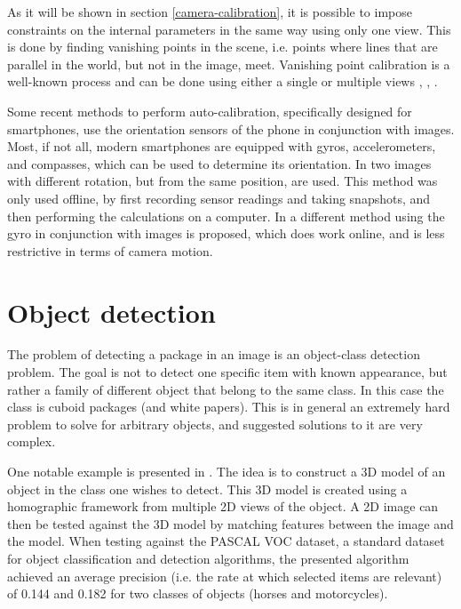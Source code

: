 As it will be shown in section \ref{camera-calibration}, it is possible to impose constraints on the internal parameters in the same way using only one view.
This is done by finding vanishing points in the scene, i.e. points where lines that are parallel in the world, but not in the image, meet.
Vanishing point calibration is a well-known process and can be done using either a single or multiple views \cite{guillou2000using}, \cite[195-226]{hartley-zisserman}, \cite{caprile1990using}.

Some recent methods to perform auto-calibration, specifically designed for smartphones, use the orientation sensors of the phone in conjunction with images.
Most, if not all, modern  smartphones are equipped with gyros, accelerometers, and compasses, which can be used to determine its orientation.
In \cite{saponaro2013towards} two images with different rotation, but from the same position, are used.
This method was only used offline, by first recording sensor readings and taking snapshots, and then performing the calculations on a computer. %
In \cite{jia2014online} a different method using the gyro in conjunction with images is proposed, which does work online, and is less restrictive in terms of camera motion.

\section{Object detection} \label{related_work:object_detection}
The problem of detecting a package in an image is an object-class detection problem.
The goal is not to detect one specific item with known appearance, but rather a family of different object that belong to the same class.
In this case the class is cuboid packages (and white papers).
This is in general an extremely hard problem to solve for arbitrary objects, and suggested solutions to it are very complex.

One notable example is presented in \cite{yan20073d}. The idea is to construct a 3D model of an object in the class one wishes to detect.
This 3D model is created using a homographic framework from  multiple 2D views of the object.
A 2D image can then be tested against the 3D model by matching features between the image and the model. 
When testing against the PASCAL VOC dataset, a standard dataset for object classification and detection algorithms, the presented algorithm achieved an average precision (i.e. the rate at which selected items are relevant) of 0.144 and 0.182 for two classes of objects (horses and motorcycles). 

